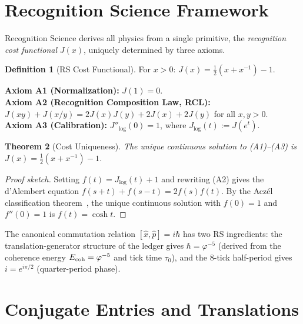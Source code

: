 \documentclass[12pt,a4paper]{article}
\newtheorem{theorem}{Theorem}[section]
\theoremstyle{definition}
\newtheorem{definition}[theorem]{Definition}
\theoremstyle{remark}
\begin{document}
\section{Recognition Science Framework}
\label{sec:framework}

Recognition Science derives all physics from a single primitive,
the \emph{recognition cost functional} $J(x)$, uniquely determined
by three axioms.

\begin{definition}[RS Cost Functional]
For $x > 0$: $J(x) = \tfrac{1}{2}(x + x^{-1}) - 1$.
\end{definition}

\noindent\textbf{Axiom A1 (Normalization):} $J(1) = 0$.\\
\textbf{Axiom A2 (Recognition Composition Law, RCL):}
$J(xy) + J(x/y) = 2J(x)J(y) + 2J(x) + 2J(y)$ for all $x, y > 0$.\\
\textbf{Axiom A3 (Calibration):} $J''_{\log}(0) = 1$, where
$J_{\log}(t) := J(e^t)$.

\begin{theorem}[Cost Uniqueness]
\label{thm:unique}
The unique continuous solution to \textup{(A1)--(A3)} is
$J(x) = \tfrac{1}{2}(x + x^{-1}) - 1$.
\end{theorem}

\begin{proof}[Proof sketch]
Setting $f(t) = J_{\log}(t) + 1$ and rewriting \textup{(A2)} gives the
d'Alembert equation $f(s+t) + f(s-t) = 2f(s)f(t)$.  By the Acz\'el
classification theorem~\cite{Aczel1966}, the unique continuous solution
with $f(0) = 1$ and $f''(0) = 1$ is $f(t) = \cosh t$.
\end{proof}

\noindent The canonical commutation relation $[\hat{x}, \hat{p}] = i\hbar$
has two RS ingredients: the translation-generator structure of the ledger
gives $\hbar = \varphi^{-5}$ (derived from the coherence energy
$E_{\rm coh} = \varphi^{-5}$ and tick time $\tau_0$), and the 8-tick
half-period gives $i = e^{i\pi/2}$ (quarter-period phase).

\section{Conjugate Entries and Translations}
\label{sec:conjugate}
\end{document}
